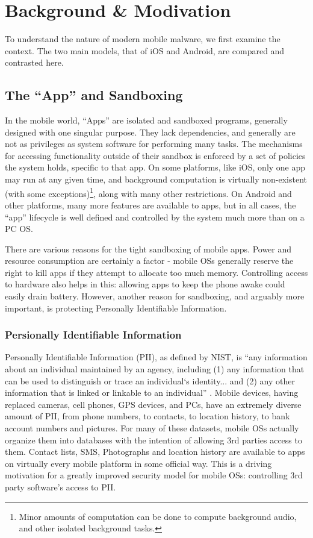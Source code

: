 \chapter{Background \& Modivation}
\label{sec:background}

To understand the nature of modern mobile malware, we first examine the context. The two main models, that of iOS and Android, are compared and contrasted here.

\section{The ``App'' and Sandboxing}

In the mobile world, ``Apps'' are isolated and sandboxed programs, generally designed with one singular purpose. They lack dependencies, and generally are not as privileges as system software for performing many tasks. The mechanisms for accessing functionality outside of their sandbox is enforced by a set of policies the system holds, specific to that app. On some platforms, like iOS, only one app may run at any given time, and background computation is virtually non-existent (with some exceptions)\footnote{Minor amounts of computation can be done to compute background audio, and other isolated background tasks.}, along with many other restrictions. On Android and other platforms, many more features are available to apps, but in all cases, the ``app'' lifecycle is well defined and controlled by the system much more than on a PC OS.

There are various reasons for the tight sandboxing of mobile apps. Power and resource consumption are certainly a factor - mobile OSs generally reserve the right to kill apps if they attempt to allocate too much memory. Controlling access to hardware also helps in this: allowing apps to keep the phone awake could easily drain battery. However, another reason for sandboxing, and arguably more important, is protecting Personally Identifiable Information.

\subsection{Persionally Identifiable Information}

Personally Identifiable Information (PII), as defined by NIST, is ``any information about an individual maintained by an agency, including (1) any information that can be used to distinguish or trace an individual‘s identity... and (2) any other information that is linked or linkable to an individual'' \citep{mccallister2010guide}. Mobile devices, having replaced cameras, cell phones, GPS devices, and PCs, have an extremely diverse amount of PII, from phone numbers, to contacts, to location history, to bank account numbers and pictures. For many of these datasets, mobile OSs actually organize them into databases with the intention of allowing 3rd parties access to them. Contact lists, SMS, Photographs and location history are available to apps on virtually every mobile platform in some official way. This is a driving motivation for a greatly improved security model for mobile OSs: controlling 3rd party software’s access to PII. 

